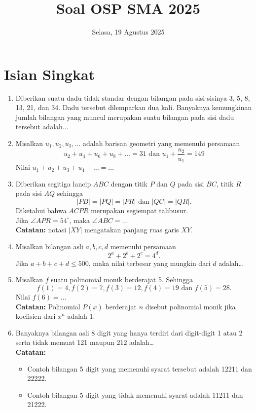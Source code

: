 \documentclass[12pt]{scrartcl}
\title{Soal OSP SMA 2025}
\date{Selasa, 19 Agustus 2025}
\begin{document}
\maketitle

\section{Isian Singkat}

\begin{enumerate}
    \item Diberikan suatu dadu tidak standar dengan bilangan pada sisi-sisinya 3, 5, 8, 13, 21, dan 34. Dadu tersebut dilemparkan dua kali. Banyaknya kemungkinan jumlah bilangan yang muncul merupakan suatu bilangan pada sisi dadu tersebut adalah...

    \item Misalkan $u_1, u_2, u_3, \dots$ adalah barisan geometri yang memenuhi persamaan 
    $$u_2 + u_4 + u_6 + u_8+\dots = 31 \text{ dan } u_1+\dfrac{u_2}{u_1} = 149$$
    Nilai $u_1 + u_2 + u_3 + u_4 + \dots = \dots$

    \item Diberikan segitiga lancip $ABC$ dengan titik $P$ dan $Q$ pada sisi $BC$, titik $R$ pada sisi $AQ$ sehingga $$|PB|=|PQ|=|PR| \text{ dan } |QC|=|QR|.$$
    Diketahui bahwa $ACPR$ merupakan segiempat talibusur.\\
    Jika $\angle APR=54^\circ$, maka $\angle ABC = \dots$ \\
    \textbf{Catatan:} notasi $|XY|$ mengatakan panjang ruas garis $XY$.

    \item Misalkan bilangan asli $a, b, c, d$ memenuhi persamaan $$2^a+2^b+2^c=4^d.$$
    Jika $a+b+c+d \le 500$, maka nilai terbesar yang mungkin dari $d$ adalah\dots

    \newpage
    \item Misalkan $f$ suatu polinomial monik berderajat 5. Sehingga 
    $$f(1)=4, f(2)=7, f(3)=12, f(4)=19 \text{ dan }f(5)=28.$$
    Nilai $f(6)=\dots$ \\
    \textbf{Catatan:} Polinomial $P(x)$ berderajat $n$ disebut polinomial monik jika koefisien dari $x^n$ adalah 1.

    \item Banyaknya bilangan asli 8 digit yang hanya terdiri dari digit-digit 1 atau 2 serta tidak memuat 121 maupun 212 adalah\dots \\
    \textbf{Catatan:}
    \begin{itemize}
        \item Contoh bilangan 5 digit yang memenuhi syarat tersebut adalah 12211 dan 22222.
        \item Contoh bilangan 5 digit yang tidak memenuhi syarat adalah 11211 dan 21222.
    \end{itemize}


\end{enumerate}
\end{document}
